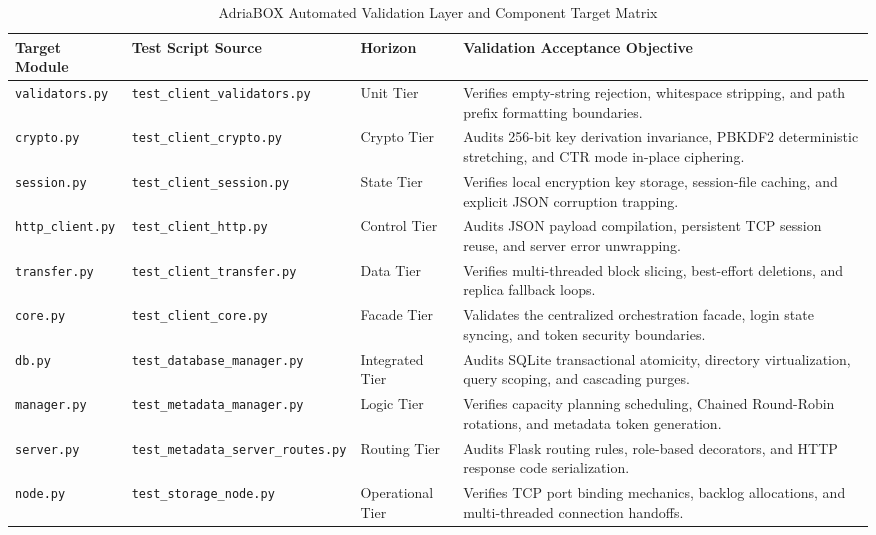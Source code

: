 \begin{table}[htbp]
\footnotesize
\centering
\caption{AdriaBOX Automated Validation Layer and Component Target Matrix}
\label{tab:automated_matrix}
\vspace{2mm}
\begin{tabularx}{\textwidth}{p{2.2cm} p{3.8cm} l X}
\toprule
\textbf{Target Module} & \textbf{Test Script Source} & \textbf{Horizon} & \textbf{Validation Acceptance Objective} \\
\midrule
\texttt{validators.py} & \texttt{test\_client\_validators.py} & Unit Tier & Verifies empty-string rejection, whitespace stripping, and path prefix formatting boundaries. \\ \addlinespace
\texttt{crypto.py} & \texttt{test\_client\_crypto.py} & Crypto Tier & Audits 256-bit key derivation invariance, PBKDF2 deterministic stretching, and CTR mode in-place ciphering. \\ \addlinespace
\texttt{session.py} & \texttt{test\_client\_session.py} & State Tier & Verifies local encryption key storage, session-file caching, and explicit JSON corruption trapping. \\ \addlinespace
\texttt{http\_client.py} & \texttt{test\_client\_http.py} & Control Tier & Audits JSON payload compilation, persistent TCP session reuse, and server error unwrapping. \\ \addlinespace
\texttt{transfer.py} & \texttt{test\_client\_transfer.py} & Data Tier & Verifies multi-threaded block slicing, best-effort deletions, and replica fallback loops. \\ \addlinespace
\texttt{core.py} & \texttt{test\_client\_core.py} & Facade Tier & Validates the centralized orchestration facade, login state syncing, and token security boundaries. \\ \addlinespace
\texttt{db.py} & \texttt{test\_database\_manager.py} & Integrated Tier & Audits SQLite transactional atomicity, directory virtualization, query scoping, and cascading purges. \\ \addlinespace
\texttt{manager.py} & \texttt{test\_metadata\_manager.py} & Logic Tier & Verifies capacity planning scheduling, Chained Round-Robin rotations, and metadata token generation. \\ \addlinespace
\texttt{server.py} & \texttt{test\_metadata\_server\_routes.py} & Routing Tier & Audits Flask routing rules, role-based decorators, and HTTP response code serialization. \\ \addlinespace
\texttt{node.py} & \texttt{test\_storage\_node.py} & Operational Tier & Verifies TCP port binding mechanics, backlog allocations, and multi-threaded connection handoffs. \\
\bottomrule
\end{tabularx}
\end{table}

